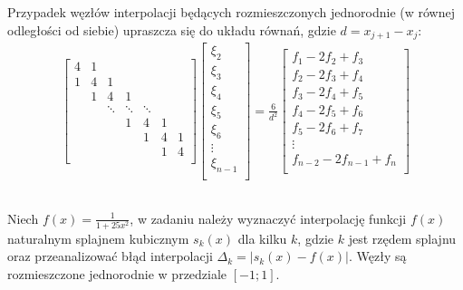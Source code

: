 \documentclass[11pt]{extarticle}
\begin{document}
	Przypadek węzłów interpolacji będących rozmieszczonych jednorodnie (w równej odległości od siebie) upraszcza się do układu równań, gdzie \(d = x_{j+1} - x_j\):
	\begin{align}
		\begin{bmatrix}
			4 & 1 \\
			1 & 4 & 1 \\
			& 1 & 4 & 1 \\
			&& \ddots & \ddots & \ddots \\
			&&& 1 & 4 & 1 \\
			&&&& 1 & 4 & 1 \\
			&&&&& 1 & 4 \\
		\end{bmatrix}
		\begin{bmatrix}
			\xi_2 \\
			\xi_3 \\
			\xi_4 \\
			\xi_5 \\
			\xi_6 \\
			\vdots \\
			\xi_{n-1} \\
		\end{bmatrix} = \frac{6}{d^2} 
		\begin{bmatrix}
			f_1 - 2f_2 + f_3 \\
			f_2 - 2f_3 + f_4 \\
			f_3 - 2f_4 + f_5 \\
			f_4 - 2f_5 + f_6 \\
			f_5 - 2f_6 + f_7 \\
			\vdots \\
			f_{n-2} - 2f_{n-1} + f_{n} \\
		\end{bmatrix}
	\end{align}

	\subsection{}
	Niech \(f(x) = \frac{1}{1+25x^2}\), w zadaniu należy wyznaczyć interpolację funkcji \(f(x)\) naturalnym splajnem kubicznym \(s_k(x)\) dla kilku \(k\), gdzie \(k\) jest rzędem splajnu oraz przeanalizować błąd interpolacji \(\Delta_k = |s_k(x) - f(x)|\).
	Węzły są rozmieszczone jednorodnie w przedziale \([-1; 1]\).
	
\end{document}
